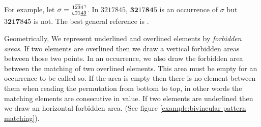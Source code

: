 \documentclass[a4paper]{llncs}
\newcommand\BV[2]{\genfrac{}{}{0pt}{}{#1}{#2}}
\begin{document}
For example,
let
$\sigma = \BV{1\overline{23}4\urcorner}{\llcorner 21\underline{43}  }$.
In $3217845$, $\textbf{32}17\textbf{84}5$ is an occurrence  of $\sigma$ but
 $3\textbf{21}\textbf{7}8\textbf{4}5$ is not.
The best general reference is \cite{Kitaev:book:2011}.

Geometrically, We represent underlined and overlined elements by \textit{forbidden areas}.
If two elements are overlined then we draw a vertical forbidden areas between those two points.
In an occurrence, we also draw the forbidden area between the matching of two overlined elements.
This area must be empty for an occurrence to be called so. 
If the area is empty then there is no element between them when reading the permutation
from bottom to top, 
in other words the matching elements are consecutive in value.
If two elements are underlined then we draw an horizontal forbidden area.
(See figure \ref{example:bivincular pattern matching}).
\end{document}
